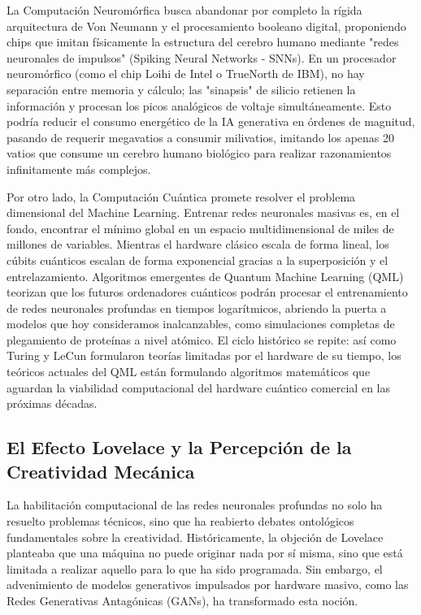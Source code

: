 \documentclass[12pt,a4paper]{article}
\begin{document}
La Computación Neuromórfica busca abandonar por completo la rígida arquitectura de Von Neumann y el procesamiento booleano digital, proponiendo chips que imitan físicamente la estructura del cerebro humano mediante "redes neuronales de impulsos" (Spiking Neural Networks - SNNs). En un procesador neuromórfico (como el chip Loihi de Intel o TrueNorth de IBM), no hay separación entre memoria y cálculo; las "sinapsis" de silicio retienen la información y procesan los picos analógicos de voltaje simultáneamente. Esto podría reducir el consumo energético de la IA generativa en órdenes de magnitud, pasando de requerir megavatios a consumir milivatios, imitando los apenas 20 vatios que consume un cerebro humano biológico para realizar razonamientos infinitamente más complejos.

Por otro lado, la Computación Cuántica promete resolver el problema dimensional del Machine Learning. Entrenar redes neuronales masivas es, en el fondo, encontrar el mínimo global en un espacio multidimensional de miles de millones de variables. Mientras el hardware clásico escala de forma lineal, los cúbits cuánticos escalan de forma exponencial gracias a la superposición y el entrelazamiento. Algoritmos emergentes de Quantum Machine Learning (QML) teorizan que los futuros ordenadores cuánticos podrán procesar el entrenamiento de redes neuronales profundas en tiempos logarítmicos, abriendo la puerta a modelos que hoy consideramos inalcanzables, como simulaciones completas de plegamiento de proteínas a nivel atómico. El ciclo histórico se repite: así como Turing y LeCun formularon teorías limitadas por el hardware de su tiempo, los teóricos actuales del QML están formulando algoritmos matemáticos que aguardan la viabilidad computacional del hardware cuántico comercial en las próximas décadas.

\subsection{El Efecto Lovelace y la Percepción de la Creatividad Mecánica}
La habilitación computacional de las redes neuronales profundas no solo ha resuelto problemas técnicos, sino que ha reabierto debates ontológicos fundamentales sobre la creatividad. Históricamente, la objeción de Lovelace planteaba que una máquina no puede originar nada por sí misma, sino que está limitada a realizar aquello para lo que ha sido programada\cite{natale2024}. Sin embargo, el advenimiento de modelos generativos impulsados por hardware masivo, como las Redes Generativas Antagónicas (GANs), ha transformado esta noción. 
\end{document}
